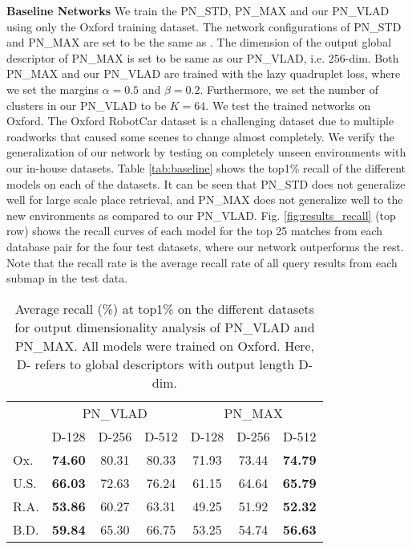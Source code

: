 \documentclass[10pt,twocolumn,letterpaper]{article}
\begin{document}
\vspace{-0.7cm}
\noindent\textbf{Baseline Networks} 
We train the PN\_STD, PN\_MAX and our PN\_VLAD using only the Oxford training dataset. The network configurations of PN\_STD and PN\_MAX are set to be the same as \cite{qi2016pointnet}. 
The dimension of the output global descriptor of PN\_MAX is set to be same as our PN\_VLAD, i.e. 256-dim.
Both PN\_MAX and our PN\_VLAD are trained with the lazy quadruplet loss, where we set the margins $\alpha=0.5$ and $\beta=0.2$. Furthermore, we set the number of clusters in our PN\_VLAD to be $K=64$. 
We test the trained networks on Oxford. The Oxford RobotCar dataset is a challenging dataset due to multiple roadworks that caused some scenes to change almost completely. We verify the generalization of our network by testing on completely unseen environments with our in-house datasets. Table \ref{tab:baseline} shows the top1\% recall of the different models on each of the datasets. 
It can be seen that PN\_STD does not generalize well for large scale place retrieval, and PN\_MAX does not generalize well to the new environments as compared to our PN\_VLAD. Fig. \ref{fig:results_recall} (top row) shows the recall curves of each model for the top 25 matches from each database pair for the four test datasets, where our network outperforms the rest. Note that the recall rate is the average recall rate of all query results from each submap in the test data. 
\newline
\begin{table}
	\begin{center}
		\begin{tabular}{|l|c|c|c|c|c|c|}
			\hline
			&\multicolumn{3}{c|}{PN\_VLAD}&\multicolumn{3}{c|}{PN\_MAX}\\
			\cline{2-7}
			&\small{D-128}&\small{D-256}&\small{D-512}&\small{D-128}&\small{D-256}&\small{D-512}\\
			\hline
			\small{Ox.}&\textbf{74.60}&80.31&80.33&71.93&73.44&\textbf{74.79}\\
			\hline
			\small{U.S.}&\textbf{66.03}&72.63&76.24&61.15&64.64&\textbf{65.79}\\
			\hline
			\small{R.A.}&\textbf{53.86}&60.27&63.31&49.25&51.92&\textbf{52.32}\\
			\hline
			\small{B.D.}&\textbf{59.84}&65.30&66.75&53.25&54.74&\textbf{56.63}\\
			\hline									
		\end{tabular}
	\end{center}
	\vspace{-0.1cm}
	\caption{Average recall (\%) at top1\% on the different datasets for output dimensionality analysis of PN\_VLAD and PN\_MAX. All models were trained on Oxford. Here, D- refers to global descriptors with output length D-dim.\vspace{-0.2cm}}
	\label{tab:dimension}
\end{table}
\end{document}

